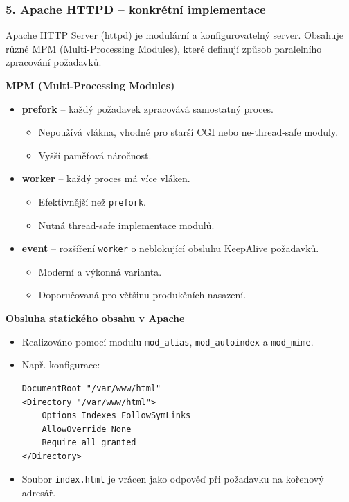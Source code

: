 \subsubsection*{5. Apache HTTPD – konkrétní implementace}

Apache HTTP Server (httpd) je modulární a konfigurovatelný server. Obsahuje různé MPM (Multi-Processing Modules), které definují způsob paralelního zpracování požadavků.

\textbf{MPM (Multi-Processing Modules)}

\begin{itemize}
    \item \textbf{prefork} – každý požadavek zpracovává samostatný proces.
        \begin{itemize}
            \item Nepoužívá vlákna, vhodné pro starší CGI nebo ne-thread-safe moduly.
            \item Vyšší paměťová náročnost.
        \end{itemize}
    \item \textbf{worker} – každý proces má více vláken.
        \begin{itemize}
            \item Efektivnější než \texttt{prefork}.
            \item Nutná thread-safe implementace modulů.
        \end{itemize}
    \item \textbf{event} – rozšíření \texttt{worker} o neblokující obsluhu KeepAlive požadavků.
        \begin{itemize}
            \item Moderní a výkonná varianta.
            \item Doporučovaná pro většinu produkčních nasazení.
        \end{itemize}
\end{itemize}

\textbf{Obsluha statického obsahu v Apache}

\begin{itemize}
    \item Realizováno pomocí modulu \texttt{mod\_alias}, \texttt{mod\_autoindex} a \texttt{mod\_mime}.
    \item Např. konfigurace:

\begin{verbatim}
DocumentRoot "/var/www/html"
<Directory "/var/www/html">
    Options Indexes FollowSymLinks
    AllowOverride None
    Require all granted
</Directory>
\end{verbatim}

    \item Soubor \texttt{index.html} je vrácen jako odpověď při požadavku na kořenový adresář.
\end{itemize}

